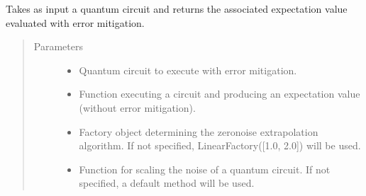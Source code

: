 \documentclass[letterpaper,10pt,english]{sphinxmanual}
\begin{document}
\begin{fulllineitems}
\label{\detokenize{apidoc:mitiq.zne.execute_with_zne}}
Takes as input a quantum circuit and returns the associated expectation value
evaluated with error mitigation.
\begin{quote}\begin{description}
\item[{Parameters}] \leavevmode\begin{itemize}
\item {} 
 \sphinxhyphen{}\sphinxhyphen{} Quantum circuit to execute with error mitigation.

\item {} 
 \sphinxhyphen{}\sphinxhyphen{} Function executing a circuit and producing an expectation value
(without error mitigation).

\item {} 
 \sphinxhyphen{}\sphinxhyphen{} Factory object determining the zero\sphinxhyphen{}noise extrapolation algorithm.
If not specified, LinearFactory({[}1.0, 2.0{]}) will be used.

\item {} 
 \sphinxhyphen{}\sphinxhyphen{} Function for scaling the noise of a quantum circuit.
If not specified, a default method will be used.

\end{itemize}

\end{description}\end{quote}

\end{fulllineitems}

\end{document}
